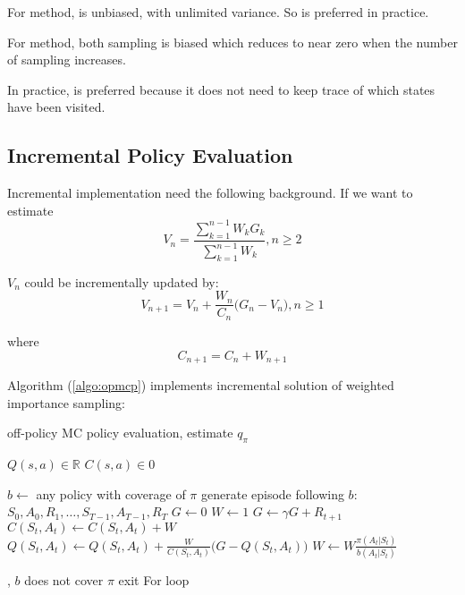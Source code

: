 For  method,  is unbiased, with unlimited variance. So  is preferred in practice.

For  method, both sampling is biased which reduces to near zero when the number of sampling increases.


In practice,  is preferred because it does not need to keep trace of which states have been visited.

\subsection{Incremental Policy Evaluation}

Incremental implementation need the following background. If we want to estimate 
\begin{equation}
	V_n = \frac{\sum\limits_{k=1}^{n-1} W_k G_k}{\sum\limits_{k=1}^{n-1} W_k}, n \geq 2
\end{equation}

$V_n$ could be incrementally updated by:
\begin{equation}
	V_{n+1} = V_n + \frac{W_n}{C_n} \Big( G_n - V_n \Big), n \geq 1
\end{equation}

where 
\begin{equation*}
	C_{n+1} = C_n + W_{n+1}
\end{equation*}

Algorithm (\ref{algo:opmcp}) implements incremental solution of weighted importance sampling:

\begin{algorithm}
	\caption{off-policy MC policy evaluation, estimate $q_\pi$}\label{algo:opmcp}	
	
	\begin{algorithmic}[1]
		\State $Q(s,a) \in \mathbb{R}$
		\State $C(s,a) \in 0$
		
		\Statex
		
		\Loop
			\State $b \gets $ any policy with coverage of $\pi$
			\State generate episode following $b$: $S_0, A_0,R_1, \dots, S_{T-1},A_{T-1},R_T$
			\State $G \gets 0$
			\State $W \gets 1$
				\State $G \gets \gamma G + R_{t+1}$
				\State $C(S_t,A_t) \gets C(S_t,A_t) + W$ 
				\State $\displaystyle Q(S_t,A_t) \gets Q(S_t,A_t) + \frac{W}{C(S_t,A_t)} \Big ( G - Q(S_t,A_t) \Big)$
				\State $\displaystyle W \gets W \frac{\pi(A_t|S_t)}{b(A_t|S_t)}$
				
				 , $b$ does not cover $\pi$
					\State exit  For loop
				\EndIf
			\EndFor
		\EndLoop
	\end{algorithmic}
\end{algorithm}



